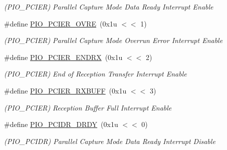 \begin{DoxyCompactItemize}
\begin{DoxyCompactList}\small\item\em (P\+I\+O\+\_\+\+P\+C\+I\+ER) Parallel Capture Mode Data Ready Interrupt Enable \end{DoxyCompactList}\item 
\mbox{\label{group__SAME70__PIO_ga88dbc7c44b5f60a8e4e29d073e6387b3}} 
\#define \mbox{\hyperlink{group__SAME70__PIO_ga88dbc7c44b5f60a8e4e29d073e6387b3}{P\+I\+O\+\_\+\+P\+C\+I\+E\+R\+\_\+\+O\+V\+RE}}~(0x1u $<$$<$ 1)
\begin{DoxyCompactList}\small\item\em (P\+I\+O\+\_\+\+P\+C\+I\+ER) Parallel Capture Mode Overrun Error Interrupt Enable \end{DoxyCompactList}\item 
\mbox{\label{group__SAME70__PIO_gac5e48cdb99a7acdd4e0fc3f526e674b7}} 
\#define \mbox{\hyperlink{group__SAME70__PIO_gac5e48cdb99a7acdd4e0fc3f526e674b7}{P\+I\+O\+\_\+\+P\+C\+I\+E\+R\+\_\+\+E\+N\+D\+RX}}~(0x1u $<$$<$ 2)
\begin{DoxyCompactList}\small\item\em (P\+I\+O\+\_\+\+P\+C\+I\+ER) End of Reception Transfer Interrupt Enable \end{DoxyCompactList}\item 
\mbox{\label{group__SAME70__PIO_gadbc31fdf1013c23b291e09419f7c195c}} 
\#define \mbox{\hyperlink{group__SAME70__PIO_gadbc31fdf1013c23b291e09419f7c195c}{P\+I\+O\+\_\+\+P\+C\+I\+E\+R\+\_\+\+R\+X\+B\+U\+FF}}~(0x1u $<$$<$ 3)
\begin{DoxyCompactList}\small\item\em (P\+I\+O\+\_\+\+P\+C\+I\+ER) Reception Buffer Full Interrupt Enable \end{DoxyCompactList}\item 
\mbox{\label{group__SAME70__PIO_ga587bc2e85bf34789a484507581645e37}} 
\#define \mbox{\hyperlink{group__SAME70__PIO_ga587bc2e85bf34789a484507581645e37}{P\+I\+O\+\_\+\+P\+C\+I\+D\+R\+\_\+\+D\+R\+DY}}~(0x1u $<$$<$ 0)
\begin{DoxyCompactList}\small\item\em (P\+I\+O\+\_\+\+P\+C\+I\+DR) Parallel Capture Mode Data Ready Interrupt Disable \end{DoxyCompactList}\item 

\end{DoxyCompactItemize}
